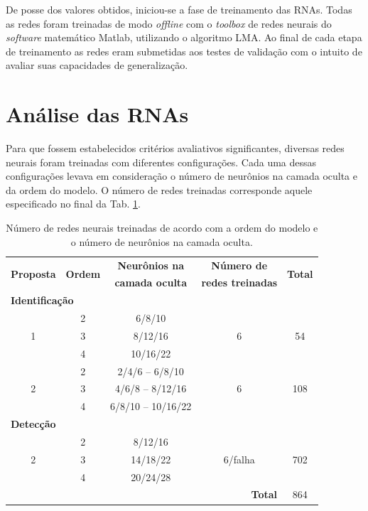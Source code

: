 De posse dos valores obtidos, iniciou-se a fase de treinamento das RNAs. Todas
as redes foram treinadas de modo {\it offline} com o {\it toolbox} de redes
neurais do {\it software} matemático Matlab\reg, utilizando o algoritmo LMA. Ao
final de cada etapa de treinamento as redes eram submetidas aos testes de
validação com o intuito de avaliar suas capacidades de generalização.

\section{Análise das RNAs}
Para que fossem estabelecidos critérios avaliativos significantes, diversas
redes neurais foram treinadas com diferentes configurações. Cada uma dessas
configurações levava em consideração o número de neurônios na camada oculta e da
ordem do modelo. O número de redes treinadas corresponde aquele especificado no
final da Tab. \ref{tab:treinamentos}. 

\begin{table}[htb]
\small
\centering
\caption[Número de redes neurais treinadas]{Número de redes neurais treinadas de
acordo com a ordem do modelo e o número de neurônios na camada oculta.}
\label{tab:treinamentos}
\vspace{0.25cm}
\begin{tabular}{|c|c|c|c|c|}
\hline
\multirow{2}{*}{\bf Proposta} & 
\multirow{2}{*}{\bf Ordem} & 
{\bf Neurônios na} & 
{\bf Número de} & 
\multirow{2}{*}{\bf Total}\\
& & {\bf camada oculta} & {\bf redes treinadas} &\\
\hline
\hline
\multicolumn{5}{|l|}{{\bf Identificação}}\\
\hline
\multirow{3}{*}{1} & 2 & 6/8/10 & \multirow{3}{*}{6} & \multirow{3}{*}{54}\\
\cline{2-3}
& 3 & 8/12/16 & &\\
\cline{2-3}
& 4 & 10/16/22 & &\\
\hline
\multirow{3}{*}{2} & 2 & 2/4/6 -- 6/8/10 & 
\multirow{3}{*}{6} & \multirow{3}{*}{108}\\
\cline{2-3}
& 3 & 4/6/8 -- 8/12/16 & & \\
\cline{2-3}
& 4 & 6/8/10 -- 10/16/22 & & \\
\hline
\multicolumn{5}{|l|}{{\bf Detecção}}\\
\hline
\multirow{3}{*}{2} & 2 & 8/12/16 & 
\multirow{3}{*}{6/falha} &
\multirow{3}{*}{702}\\
\cline{2-3}
& 3 & 14/18/22 & &\\
\cline{2-3}
& 4 & 20/24/28 & &\\
\hline
\hline
\multicolumn{4}{|r|}{{\bf Total}} & 864\\
\hline
\end{tabular}
\end{table}

